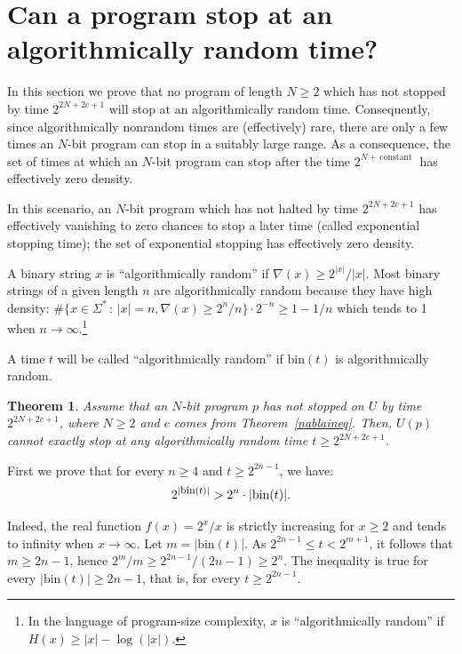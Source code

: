 \documentclass[12pt,twoside,openright]{report}
\newtheorem{thm}{Theorem}
\newcommand{\bin}{\mbox{bin}}
\newcommand{\fbin}{\mbox{\rm \footnotesize{bin}}}
\newcommand{\myproof}{\noindent {\em Proof.}  }
\begin{document}
\section{Can a program stop at an algorithmically random time?}

In this section we prove that no program of length $N\ge 2$ which has not stopped by time $2^{2N+2c+1}$ will stop at an algorithmically random time.  Consequently, since  algorithmically nonrandom times are (effectively) rare, there are only a few times an $N$-bit program can stop in a suitably large range.  As a consequence, the set of times at which an $N$-bit program can stop after the time $2^{N +\,\mbox{constant }}$ has effectively zero density.

In this scenario, an $N$-bit program which has not halted by time
$2^{2N+2c+1}$ has effectively vanishing to zero chances to stop a later time
(called exponential stopping time); the set of exponential stopping has effectively zero density.
\fi

\medskip 

A binary string $x$ is ``algorithmically random'' if $\nabla (x) \ge  2^{|x|}/|x|$. Most binary strings of a given length $n$ are  algorithmically random because they have high density:  $\#\{ x \in \Sigma^{*} \,:\, |x|=n, \nabla (x) \ge 2^{n}/n\}\cdot 2^{-n} \ge 1 - 1/n$ which tends to 1 when $n \rightarrow \infty$.\footnote{In the language of program-size complexity, $x$ is ``algorithmically random'' if $H(x) \ge |x| - \log (|x|)$.}

A time $t$ will be called ``algorithmically random'' if $\bin (t)$ is algorithmically random. 

\begin{thm}
\label{randstop}
Assume that an $N$-bit program $p$ has not stopped on $U$  by time $2^{2N+2c+1}$, where $N\ge 2$ and $c$ comes from Theorem~\ref{nablaineq}.  Then, $U(p)$ cannot exactly stop at any algorithmically random time $t \ge 2^{2N+2c+1}$.
\end{thm}

\myproof First we prove that for every $n\ge 4$  and $t\ge 2^{2n-1}$, we have: 
\begin{equation}
\label{ubound}
2^{|\fbin(t)|} > 2^{n} \cdot |\bin(t)|.
\end{equation}


Indeed, the real function $f(x) = 2^{x}/x$ is strictly increasing for $x \ge 2$ and tends to infinity when $x \rightarrow \infty$.  Let $m=|\bin(t)|$.  As $2^{2n-1} \le t < 2^{m+1}$, it follows that $m \ge 2n-1$, hence  $2^{m}/m \ge 2^{2n-1}/(2n-1) \ge 2^{n}$.  The inequality  is true for every $|\bin (t)| \ge  2n-1$, that is, for every $t\ge 2^{2n-1}$.
\end{document}
